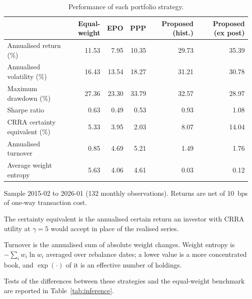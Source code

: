 \begin{table}[htbp]
\centering
\footnotesize
\caption{Performance of each portfolio strategy.}
\label{tab:performance}
\begin{threeparttable}
\begin{tabular}{lrrrrr}
\toprule
 & {Equal-weight} & {EPO} & {PPP} & {Proposed (hist.)} & {Proposed (ex post)} \\
\midrule
Annualised return (\%) & 11.53 & 7.95 & 10.35 & 29.73 & 35.39 \\
Annualised volatility (\%) & 16.43 & 13.54 & 18.27 & 31.21 & 30.78 \\
Maximum drawdown (\%) & 27.36 & 23.30 & 33.79 & 32.57 & 28.97 \\
Sharpe ratio & 0.63 & 0.49 & 0.53 & 0.93 & 1.08 \\
CRRA certainty equivalent (\%) & 5.33 & 3.95 & 2.03 & 8.07 & 14.04 \\
Annualised turnover & 0.85 & 4.69 & 5.21 & 1.49 & 1.76 \\
Average weight entropy & 5.63 & 4.06 & 4.61 & 0.03 & 0.12 \\
\bottomrule
\end{tabular}
\begin{tablenotes}[flushleft]\footnotesize
\item Sample 2015-02 to 2026-01 (132 monthly observations). Returns are net of 10~bps of one-way transaction cost.
\item The certainty equivalent is the annualised certain return an investor with CRRA utility at $\gamma=5$ would accept in place of the realised series.
\item Turnover is the annualised sum of absolute weight changes. Weight entropy is $-\sum_i w_i \ln w_i$ averaged over rebalance dates; a lower value is a more concentrated book, and $\exp(\cdot)$ of it is an effective number of holdings.
\item Tests of the differences between these strategies and the equal-weight benchmark are reported in Table~\ref{tab:inference}.
\end{tablenotes}
\end{threeparttable}
\end{table}
